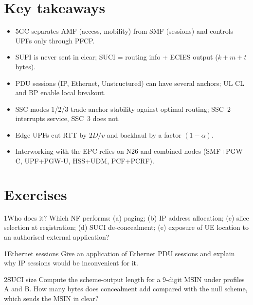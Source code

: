\documentclass[11pt,a4paper]{article}
\begin{document}
\section{Key takeaways}
\begin{takeawaybox}
\begin{itemize}
  \item 5GC separates AMF (access, mobility) from SMF (sessions) and controls UPFs only through PFCP.
  \item SUPI is never sent in clear; SUCI = routing info + ECIES output ($k + m + t$ bytes).
  \item PDU sessions (IP, Ethernet, Unstructured) can have several anchors; UL CL and BP enable local breakout.
  \item SSC modes 1/2/3 trade anchor stability against optimal routing; SSC~2 interrupts service, SSC~3 does not.
  \item Edge UPFs cut RTT by $2D/v$ and backhaul by a factor $(1-\alpha)$.
  \item Interworking with the EPC relies on N26 and combined nodes (SMF+PGW-C, UPF+PGW-U, HSS+UDM, PCF+PCRF).
\end{itemize}
\end{takeawaybox}

\section{Exercises}

\begin{exercisebox}{1}{Who does it?}\label{exr:who}
Which NF performs: (a) paging; (b) IP address allocation; (c) slice selection at registration; (d) SUCI de-concealment;
(e) exposure of UE location to an authorised external application?
\end{exercisebox}

\begin{exercisebox}{1}{Ethernet sessions}\label{exr:eth}
Give an application of Ethernet PDU sessions and explain why IP sessions would be inconvenient for it.
\end{exercisebox}

\begin{exercisebox}{2}{SUCI size}\label{exr:suci}
Compute the scheme-output length for a 9-digit MSIN under profiles A and B. How many bytes does concealment add compared with the
null scheme, which sends the MSIN in clear?
\end{exercisebox}
\end{document}
